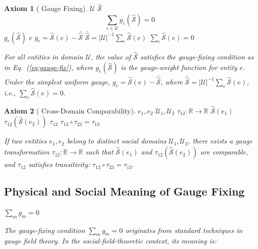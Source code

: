 \documentclass[11pt,a4paper]{article}
\theoremstyle{definition}
\newtheorem{axiom}{ Axiom}[section]
\newcommand{\Sop}{\hat{\mathcal{S}}}
\newcommand{\R}{\mathbb{R}}
\newcommand{\universe}{\mathcal{U}}
\begin{document}
\begin{axiom}[ Gauge Fixing] \label{ax:gauge}
 $\universe$ $\Sop$ 
\begin{equation}
    \sum_{e \in \universe} g_e(\Sop) = 0
    \label{eq:gauge-fix}
\end{equation}
 $g_e(\Sop)$  $e$ $g_e = \Sop(e) - \bar{\Sop}$
 $\bar{\Sop} = |\universe|^{-1} \sum_{e} \Sop(e)$ $\sum_{e} \Sop(e) = 0$

\medskip
\noindent\textit{For all entities in domain $\universe$, the value of $\Sop$ satisfies the gauge-fixing condition as in Eq.~(\ref{eq:gauge-fix}), where $g_e(\Sop)$ is the gauge-weight function for entity $e$. Under the simplest uniform gauge, $g_e = \Sop(e) - \bar{\Sop}$, where $\bar{\Sop} = |\universe|^{-1} \sum_{e} \Sop(e)$, i.e., $\sum_{e} \Sop(e) = 0$.}
\end{axiom}

\begin{axiom}[ Cross-Domain Comparability] \label{ax:compare}
 $e_1, e_2$  $\universe_1, \universe_2$
 $\tau_{12}: \R \to \R$  $\Sop(e_1)$  $\tau_{12}(\Sop(e_2))$
 $\tau_{12}$ $\tau_{12} \circ \tau_{23} = \tau_{13}$

\medskip
\noindent\textit{If two entities $e_1, e_2$ belong to distinct social domains $\universe_1, \universe_2$, there exists a gauge transformation $\tau_{12}: \R \to \R$ such that $\Sop(e_1)$ and $\tau_{12}(\Sop(e_2))$ are comparable, and $\tau_{12}$ satisfies transitivity: $\tau_{12} \circ \tau_{23} = \tau_{13}$.}
\end{axiom}

\subsection{ Physical and Social Meaning of Gauge Fixing}

 $\sum_m g_m = 0$ 


\medskip
\noindent\textit{The gauge-fixing condition $\sum_m g_m = 0$ originates from standard techniques in gauge field theory. In the social-field-theoretic context, its meaning is:}
\end{document}
